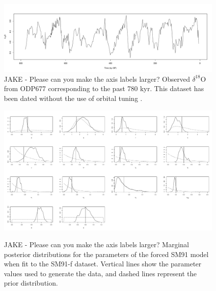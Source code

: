 \documentclass[a4paper,12pt]{article}
\begin{document}
%


\clearpage

\begin{figure}
\centering
\includegraphics[width=\textwidth]{ODP677Plot.pdf}
\caption{
JAKE - Please can you make the axis labels larger?
Observed $\delta^{18}\mbox{O}$ from ODP677 \cite{Shackleton1990} corresponding to the past 780 kyr.
This dataset has been dated without the use of orbital tuning  \cite{Huybers2007}.}
\label{Fig:Data}
\end{figure}



\clearpage

\begin{figure}
\centering
\includegraphics[width=\textwidth]{MSSSPE.pdf}\\\vspace{24pt}
\caption{
JAKE - Please can you make the axis labels larger?
Marginal posterior distributions for the parameters of the forced SM91 model when fit to the  SM91-f dataset.
Vertical lines show the parameter values used to generate the data, and dashed lines represent the prior distribution. 
}
\label{Fig:PosteriorSS}
\end{figure}
\end{document}
